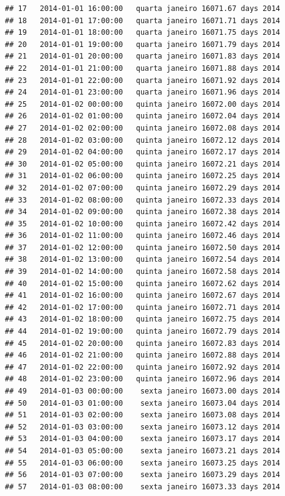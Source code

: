 \documentclass[]{book}
\begin{document}
\begin{verbatim}
## 17   2014-01-01 16:00:00   quarta janeiro 16071.67 days 2014
## 18   2014-01-01 17:00:00   quarta janeiro 16071.71 days 2014
## 19   2014-01-01 18:00:00   quarta janeiro 16071.75 days 2014
## 20   2014-01-01 19:00:00   quarta janeiro 16071.79 days 2014
## 21   2014-01-01 20:00:00   quarta janeiro 16071.83 days 2014
## 22   2014-01-01 21:00:00   quarta janeiro 16071.88 days 2014
## 23   2014-01-01 22:00:00   quarta janeiro 16071.92 days 2014
## 24   2014-01-01 23:00:00   quarta janeiro 16071.96 days 2014
## 25   2014-01-02 00:00:00   quinta janeiro 16072.00 days 2014
## 26   2014-01-02 01:00:00   quinta janeiro 16072.04 days 2014
## 27   2014-01-02 02:00:00   quinta janeiro 16072.08 days 2014
## 28   2014-01-02 03:00:00   quinta janeiro 16072.12 days 2014
## 29   2014-01-02 04:00:00   quinta janeiro 16072.17 days 2014
## 30   2014-01-02 05:00:00   quinta janeiro 16072.21 days 2014
## 31   2014-01-02 06:00:00   quinta janeiro 16072.25 days 2014
## 32   2014-01-02 07:00:00   quinta janeiro 16072.29 days 2014
## 33   2014-01-02 08:00:00   quinta janeiro 16072.33 days 2014
## 34   2014-01-02 09:00:00   quinta janeiro 16072.38 days 2014
## 35   2014-01-02 10:00:00   quinta janeiro 16072.42 days 2014
## 36   2014-01-02 11:00:00   quinta janeiro 16072.46 days 2014
## 37   2014-01-02 12:00:00   quinta janeiro 16072.50 days 2014
## 38   2014-01-02 13:00:00   quinta janeiro 16072.54 days 2014
## 39   2014-01-02 14:00:00   quinta janeiro 16072.58 days 2014
## 40   2014-01-02 15:00:00   quinta janeiro 16072.62 days 2014
## 41   2014-01-02 16:00:00   quinta janeiro 16072.67 days 2014
## 42   2014-01-02 17:00:00   quinta janeiro 16072.71 days 2014
## 43   2014-01-02 18:00:00   quinta janeiro 16072.75 days 2014
## 44   2014-01-02 19:00:00   quinta janeiro 16072.79 days 2014
## 45   2014-01-02 20:00:00   quinta janeiro 16072.83 days 2014
## 46   2014-01-02 21:00:00   quinta janeiro 16072.88 days 2014
## 47   2014-01-02 22:00:00   quinta janeiro 16072.92 days 2014
## 48   2014-01-02 23:00:00   quinta janeiro 16072.96 days 2014
## 49   2014-01-03 00:00:00    sexta janeiro 16073.00 days 2014
## 50   2014-01-03 01:00:00    sexta janeiro 16073.04 days 2014
## 51   2014-01-03 02:00:00    sexta janeiro 16073.08 days 2014
## 52   2014-01-03 03:00:00    sexta janeiro 16073.12 days 2014
## 53   2014-01-03 04:00:00    sexta janeiro 16073.17 days 2014
## 54   2014-01-03 05:00:00    sexta janeiro 16073.21 days 2014
## 55   2014-01-03 06:00:00    sexta janeiro 16073.25 days 2014
## 56   2014-01-03 07:00:00    sexta janeiro 16073.29 days 2014
## 57   2014-01-03 08:00:00    sexta janeiro 16073.33 days 2014

\end{verbatim}
\end{document}
